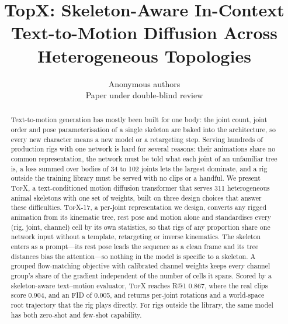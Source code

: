 \documentclass{article} %
\title{TopX: Skeleton-Aware In-Context \\ Text-to-Motion Diffusion Across \\ Heterogeneous Topologies}
\author{Anonymous authors\\ Paper under double-blind review}
\newcommand{\method}{\textsc{TopX}}          %
\newcommand{\rep}{\method{}-17}                %
\newcommand{\num}[1]{#1}                       %
\begin{document}
\maketitle

\begin{abstract}
Text-to-motion generation has mostly been built for one body: the joint count, joint order and pose
parameterisation of a single skeleton are baked into the architecture, so every new character means a new
model or a retargeting step. Serving hundreds of production rigs with one network is hard for several
reasons: their animations share no common representation, the network must be told what each joint of an
unfamiliar tree is, a loss summed over bodies of 34 to 102 joints lets the largest dominate, and a rig outside
the training library must be served with no clips or a handful. We present \method{}, a text-conditioned
motion diffusion transformer that serves \num{311} heterogeneous animal skeletons with one set of weights,
built on three design choices that answer these difficulties. \rep{}, a per-joint representation we design,
converts any rigged animation from its kinematic tree, rest pose and motion alone and standardises every
(rig, joint, channel) cell by its own statistics, so that rigs of any proportion share one network input
without a template, retargeting or inverse kinematics. The skeleton enters as a prompt---its rest pose leads
the sequence as a clean frame and its tree distances bias the attention---so nothing in the model is specific
to a skeleton. A grouped flow-matching objective with calibrated channel weights keeps every channel group's
share of the gradient independent of the number of cells it spans. Scored by a skeleton-aware text--motion
evaluator, \method{} reaches R@1 \num{0.867}, where the real clips score \num{0.904}, and an FID of
\num{0.005}, and returns per-joint rotations and a world-space root trajectory that the rig plays directly.
For rigs outside the library, the same model has both zero-shot and few-shot capability.
\end{abstract}










\newpage

\end{document}
